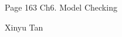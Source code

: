 \documentclass{article}
\begin{document}
\large %


{\Large Page 163 %
\hfill  Ch6. Model Checking}

\begin{center}
{\Large Xinyu Tan} 
\end{center}
\vspace{0.05in}

 \renewcommand{\labelitemi}{$\textendash$}
\end{document}
